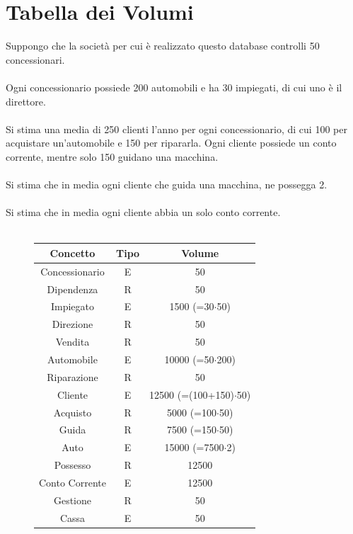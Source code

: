 \documentclass[12pt,a4paper]{article}
\begin{document}
\section{Tabella dei Volumi}
	Suppongo che la società per cui è realizzato questo database controlli 50 concessionari.\\
	\\
	Ogni concessionario possiede 200 automobili e ha 30 impiegati, di cui uno è il direttore.\\
	\\
	Si stima una media di 250 clienti l’anno per ogni concessionario, di cui 100 per acquistare un’automobile e 150 per ripararla. Ogni cliente possiede un conto corrente, mentre solo 150 guidano una macchina.\\
	\\
	Si stima che in media ogni cliente che guida una macchina, ne possegga 2.\\
	\\
	Si stima che in media ogni cliente abbia un solo conto corrente.\\
	\\
\begin{figure}[H]
	\centering
\begin{tabular}{|c|c|c|}
	\hline
	\textbf{Concetto} & \textbf{Tipo} & \textbf{Volume} \\
	\hline
	Concessionario& E & 50 \\
	\hline
	Dipendenza & R & 50 \\
	\hline
	Impiegato & E & 1500 (=30$\cdot$50) \\
	\hline
	Direzione & R & 50 \\
	\hline
	Vendita & R & 50 \\
	\hline
	Automobile & E & 10000 (=50$\cdot$200) \\
	\hline
	Riparazione & R & 50 \\
	\hline
	Cliente & E & 12500 (=(100+150)$\cdot$50) \\
	\hline
	Acquisto & R & 5000 (=100$\cdot$50) \\
	\hline
	Guida & R & 7500 (=150$\cdot$50) \\
	\hline
	Auto & E & 15000 (=7500$\cdot$2) \\
	\hline
	Possesso & R & 12500 \\
	\hline
	Conto Corrente & E & 12500 \\
	\hline
	Gestione & R & 50 \\
	\hline
	Cassa & E & 50 \\
	\hline
\end{tabular}

\end{figure}
\end{document}
